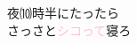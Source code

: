 \documentclass[tate]{ltjarticle}
\begin{document}
\setlength{\baselineskip}{100pt}
\setlength{\parindent}{0em}

\centering




夜⑽時半にたったら\\
さっさと\textcolor{pink}{シコって}寝ろ\\

\end{document}
